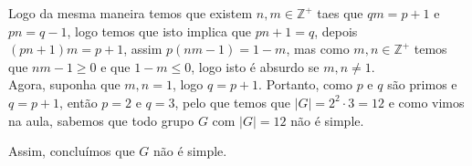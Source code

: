 \begin{homeworkProblem}[6]
\begin{solution}
\begin{itemize}
        Logo da mesma maneira temos que existem $n,m\in\mathbb{Z}^{+}$ taes que $qm=p+1$ e $pn=q-1$, logo temos que isto implica que $pn+1=q$, depois $(pn+1)m=p+1$, assim $p(nm-1)=1-m$, mas como $m,n\in\mathbb{Z}^{+}$ temos que $nm-1\geq 0$ e que $1-m\leq 0$, logo isto é absurdo se $m,n\neq 1$.\\
        Agora, suponha que $m,n=1$, logo $q=p+1$. Portanto, como $p$ e $q$ são primos e $q=p+1$, então $p=2$ e $q=3$, pelo que temos que $|G|=2^{2}\cdot 3=12$ e como vimos na aula, sabemos que todo grupo $G$ com $|G|=12$ não é simple. 
    \end{itemize}
    Assim, concluímos que $G$ não é simple.
   \end{solution}
\end{homeworkProblem}
